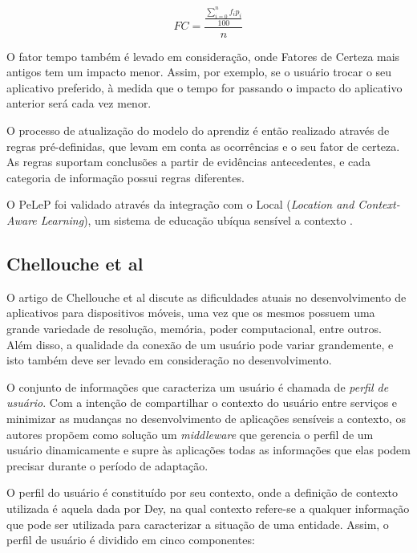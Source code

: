 \begin{equation}
  FC = \frac{\frac{\displaystyle\sum_{i=0}^n f_i p_i}{100}}{n}
  \label{eq:pelep-fc}
\end{equation}

O fator tempo também é levado em consideração, onde Fatores de Certeza mais antigos tem um impacto menor. Assim, por exemplo, se o usuário trocar o seu aplicativo preferido, à medida que o tempo for passando o impacto do aplicativo anterior será cada vez menor.

O processo de atualização do modelo do aprendiz é então realizado através de regras pré-definidas, que levam em conta as ocorrências e o seu fator de certeza. As regras suportam conclusões a partir de evidências antecedentes, e cada categoria de informação possui regras diferentes.

O PeLeP foi validado através da integração com o Local ({\em Location and Context-Aware Learning}), um sistema de educação ubíqua sensível a contexto \cite{barbosa08}.


\subsection{Chellouche et al}

O artigo de Chellouche et al\cite{chellouche10} discute as dificuldades atuais no desenvolvimento de aplicativos para dispositivos móveis, uma vez que os mesmos possuem uma grande variedade de resolução, memória, poder computacional, entre outros. Além disso, a qualidade da conexão de um usuário pode variar grandemente, e isto também deve ser levado em consideração no desenvolvimento.

O conjunto de informações que caracteriza um usuário é chamada de \emph{perfil de usuário}. Com a intenção de compartilhar o contexto do usuário entre serviços e minimizar as mudanças no desenvolvimento de aplicações sensíveis a contexto, os autores propõem como solução um \emph{middleware} que gerencia o perfil de um usuário dinamicamente e supre às aplicações todas as informações que elas podem precisar durante o período de adaptação.

O perfil do usuário é constituído por seu contexto, onde a definição de contexto utilizada é aquela dada por Dey\cite{dey2001}, na qual contexto refere-se a qualquer informação que pode ser utilizada para caracterizar a situação de uma entidade. Assim, o perfil de usuário é dividido em cinco componentes:

